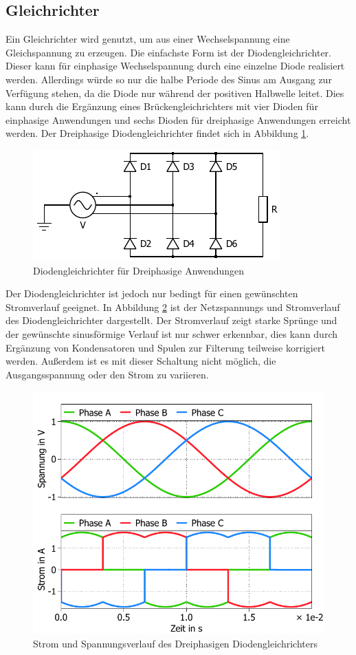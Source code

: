 		\subsection{Gleichrichter}
		\label{sec:Rec}
		Ein Gleichrichter wird genutzt, um aus einer Wechselspannung eine Gleichspannung zu erzeugen. Die einfachste Form ist der Diodengleichrichter. Dieser kann für einphasige Wechselspannung durch eine einzelne Diode realisiert werden. Allerdings würde so nur die halbe Periode des Sinus am Ausgang zur Verfügung stehen, da die Diode nur während der positiven Halbwelle leitet. Dies kann durch die Ergänzung eines Brückengleichrichters mit vier Dioden für einphasige Anwendungen und sechs Dioden für dreiphasige Anwendungen erreicht werden. Der Dreiphasige Diodengleichrichter findet sich in Abbildung \ref{fig:B6DiodRect}.\\
		\begin{figure}
			\centering
			\includegraphics[width=0.8\linewidth]{content/Grafiken/Plecs_Diodengleichrichter}
			\caption{Diodengleichrichter für Dreiphasige Anwendungen}
			\label{fig:B6DiodRect}
		\end{figure}
		Der Diodengleichrichter ist jedoch nur bedingt für einen gewünschten Stromverlauf geeignet. In Abbildung \ref{fig:B6DiodRectI} ist der Netzspannungs und Stromverlauf des Diodengleichrichter dargestellt. Der Stromverlauf zeigt starke Sprünge und der gewünschte sinusförmige Verlauf ist nur schwer erkennbar, dies kann durch Ergänzung von Kondensatoren und Spulen zur Filterung teilweise korrigiert werden. Außerdem ist es mit dieser Schaltung nicht möglich, die Ausgangsspannung oder den Strom zu variieren.\\
		\begin{figure}
			\centering
			\includegraphics[width=0.65\linewidth]{content/Grafiken/B6-Diodengleichrichter-Eingangsverlauf}
			\caption{Strom und Spannungsverlauf des Dreiphasigen Diodengleichrichters }
			\label{fig:B6DiodRectI}
		\end{figure}
